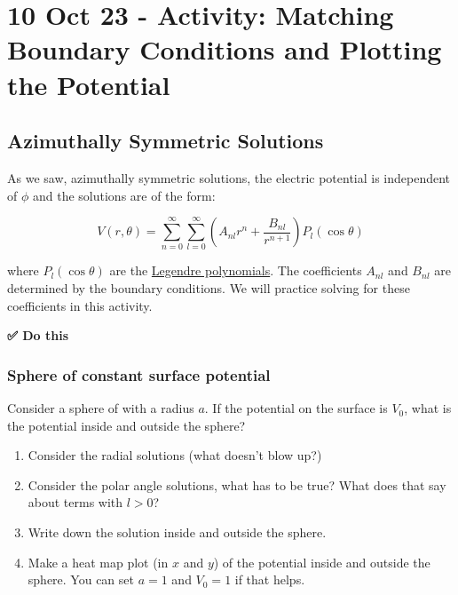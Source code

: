 \section{10 Oct 23 - Activity: Matching Boundary Conditions and Plotting
the
Potential}\label{oct-23---activity-matching-boundary-conditions-and-plotting-the-potential}

\subsection{Azimuthally Symmetric
Solutions}\label{azimuthally-symmetric-solutions}

As we saw, azimuthally symmetric solutions, the electric potential is
independent of \(\phi\) and the solutions are of the form:

\[V(r,\theta) = \sum_{n=0}^\infty \sum_{l=0}^\infty \left(A_{nl} r^n + \frac{B_{nl}}{r^{n+1}}\right) P_l(\cos\theta)\]

where \(P_l(\cos\theta)\) are the
\href{https://en.wikipedia.org/wiki/Legendre_polynomials}{Legendre
polynomials}. The coefficients \(A_{nl}\) and \(B_{nl}\) are determined
by the boundary conditions. We will practice solving for these
coefficients in this activity.

\textbf{✅ Do this}

\subsubsection{Sphere of constant surface
potential}\label{sphere-of-constant-surface-potential}

Consider a sphere of with a radius \(a\). If the potential on the
surface is \(V_0\), what is the potential inside and outside the sphere?

\begin{enumerate}
\def\labelenumi{\arabic{enumi}.}
\tightlist
\item
  Consider the radial solutions (what doesn't blow up?)
\item
  Consider the polar angle solutions, what has to be true? What does
  that say about terms with \(l>0\)?
\item
  Write down the solution inside and outside the sphere.
\item
  Make a heat map plot (in \(x\) and \(y\)) of the potential inside and
  outside the sphere. You can set \(a=1\) and \(V_0=1\) if that helps.
\end{enumerate}

\begin{Shaded}
\begin{Highlighting}[]
\end{Highlighting}
\end{Shaded}

